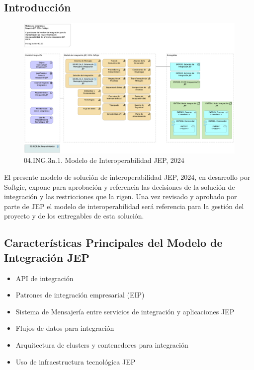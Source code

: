 \documentclass[
  paper=a4,
  ,captions=tableheading
]{scrartcl}
\providecommand{\tightlist}{%
  \setlength{\itemsep}{0pt}\setlength{\parskip}{0pt}}
\begin{document}
\subsection{Introducción}\label{sec:introducciuxf3n}

\begin{figure}
\centering
\includegraphics{01.1n.modelointegrac.png}
\caption{04.ING.3n.1. Modelo de Interoperabilidad JEP, 2024}
\end{figure}

El presente modelo de solución de interoperabilidad JEP, 2024, en
desarrollo por Softgic, expone para aprobación y referencia las
decisiones de la solución de integración y las restricciones que la
rigen. Una vez revisado y aprobado por parte de JEP el modelo de
interoperabilidad será referencia para la gestión del proyecto y de los
entregables de esta solución.

\subsection{Características Principales del Modelo de Integración
JEP}\label{sec:caracteruxedsticas-principales-del-modelo-de-integraciuxf3n-jep}

\begin{itemize}
\tightlist
\item
  API de integración
\item
  Patrones de integración empresarial (EIP)
\item
  Sistema de Mensajería entre servicios de integración y aplicaciones
  JEP
\item
  Flujos de datos para integración
\item
  Arquitectura de clusters y contenedores para integración
\item
  Uso de infraestructura tecnológica JEP
\end{itemize}
\end{document}
